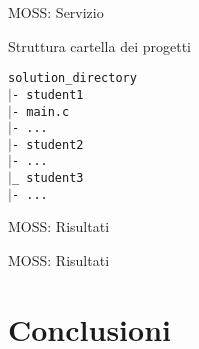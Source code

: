 \documentclass{beamer}
\newcommand\tab[1][1cm]{\hspace*{#1}}	%
\begin{document}
	\begin{frame}{MOSS: Servizio}
		\begin{block}{Struttura cartella dei progetti}
		 	\begin{tcolorbox}
				\texttt{\tab solution\_directory\\ 
					\tab $\vert$- student1\\
					\tab[1.5cm] $\vert$- main.c\\
					\tab[1.5cm] $\vert$- ...\\
					\tab $\vert$- student2\\
					\tab[1.5cm] $\vert$- ...\\
					\tab $\vert$\_ student3\\
					\tab[1.5cm] $\vert$- ...
				}
			\end{tcolorbox}
		\end{block}
	\end{frame}
	
	\begin{frame}{MOSS: Risultati}
		\begin{center}
		\end{center}
	\end{frame}

	\begin{frame}{MOSS: Risultati}
		\begin{center}
		\end{center}
	\end{frame}
	\section{Conclusioni}

%

\end{document}
